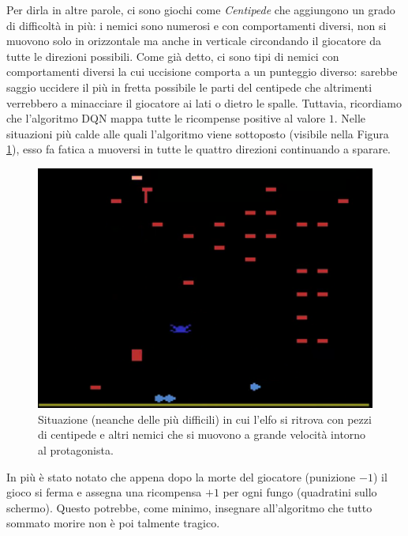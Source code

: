 \documentclass[twoside,twocolumn,10pt]{extarticle}
\theoremstyle{definition}
\begin{document}
		Per dirla in altre parole, ci sono giochi come \textit{Centipede} che aggiungono un grado di difficoltà in più: i nemici sono numerosi e con comportamenti diversi, non si muovono solo in orizzontale ma anche in verticale circondando il giocatore da tutte le direzioni possibili. Come già detto, ci sono tipi di nemici con comportamenti diversi la cui uccisione comporta a un punteggio diverso: sarebbe saggio uccidere il più in fretta possibile le parti del centipede che altrimenti verrebbero a minacciare il giocatore ai lati o dietro le spalle. Tuttavia, ricordiamo che l'algoritmo DQN mappa tutte le ricompense positive al valore $1$. Nelle situazioni più calde alle quali l'algoritmo viene sottoposto (visibile nella Figura \ref{fig:centipede}), esso fa fatica a muoversi in tutte le quattro direzioni continuando a sparare.		
		\begin{figure}[t]
			\centering
			\includegraphics[scale=.5]{images/centipede1.png}
			\caption{Situazione (neanche delle più difficili) in cui l'elfo si ritrova con pezzi di centipede e altri nemici che si muovono a grande velocità intorno al protagonista.}
			\label{fig:centipede}
		\end{figure}
		In più è stato notato che appena dopo la morte del giocatore (punizione $-1$) il gioco si ferma e assegna una ricompensa $+1$ per ogni fungo (quadratini sullo schermo). Questo potrebbe, come minimo, insegnare all'algoritmo che tutto sommato morire non è poi talmente tragico. 
		
\end{document}
